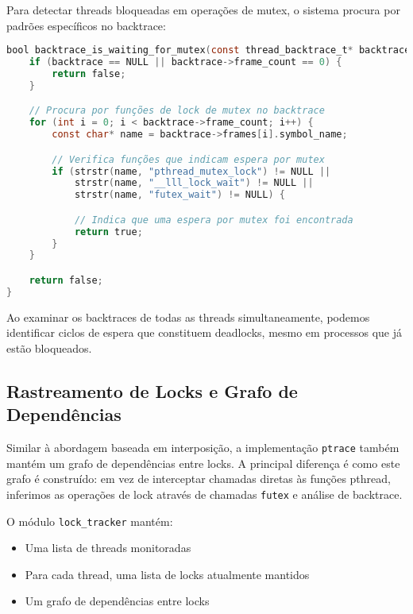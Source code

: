 Para detectar threads bloqueadas em operações de mutex, o sistema procura por padrões específicos no backtrace:

\begin{lstlisting}[language=C, caption={Detecção de threads bloqueadas em mutexes via backtrace}]
bool backtrace_is_waiting_for_mutex(const thread_backtrace_t* backtrace, void** mutex_addr) {
    if (backtrace == NULL || backtrace->frame_count == 0) {
        return false;
    }

    // Procura por funções de lock de mutex no backtrace
    for (int i = 0; i < backtrace->frame_count; i++) {
        const char* name = backtrace->frames[i].symbol_name;

        // Verifica funções que indicam espera por mutex
        if (strstr(name, "pthread_mutex_lock") != NULL ||
            strstr(name, "__lll_lock_wait") != NULL ||
            strstr(name, "futex_wait") != NULL) {

            // Indica que uma espera por mutex foi encontrada
            return true;
        }
    }

    return false;
}
\end{lstlisting}

Ao examinar os backtraces de todas as threads simultaneamente, podemos identificar ciclos de espera que constituem deadlocks, mesmo em processos que já estão bloqueados.

\subsection{Rastreamento de Locks e Grafo de Dependências}

Similar à abordagem baseada em interposição, a implementação \texttt{ptrace} também mantém um grafo de dependências entre locks. A principal diferença é como este grafo é construído: em vez de interceptar chamadas diretas às funções pthread, inferimos as operações de lock através de chamadas \texttt{futex} e análise de backtrace.

O módulo \texttt{lock\_tracker} mantém:

\begin{itemize}
    \item Uma lista de threads monitoradas
    \item Para cada thread, uma lista de locks atualmente mantidos
    \item Um grafo de dependências entre locks
\end{itemize}

